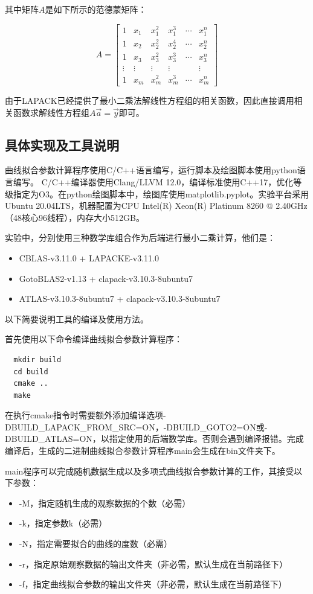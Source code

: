 \documentclass[a4paper]{article}
\begin{document}
其中矩阵$A$是如下所示的范德蒙矩阵：

\begin{equation*}
  A=
  \begin{bmatrix}
    1      & x_1    & x_1^2  & x_1^3  & \cdots & x_1^n  \\
    1      & x_2    & x_2^2  & x_2^4  & \cdots & x_2^n  \\
    1      & x_3    & x_3^2  & x_3^3  & \cdots & x_3^n  \\
    \vdots & \vdots & \vdots & \vdots &        & \vdots \\
    1      & x_m    & x_m^2  & x_m^3  & \cdots & x_m^n
  \end{bmatrix}
\end{equation*}

由于LAPACK已经提供了最小二乘法解线性方程组的相关函数，因此直接调用相关函数求解线性方程组$A\overrightarrow{a}=\overrightarrow{y}$即可。

\subsection{具体实现及工具说明}
曲线拟合参数计算程序使用C/C++语言编写，运行脚本及绘图脚本使用python语言编写。
C/C++编译器使用Clang/LLVM 12.0，编译标准使用C++17，优化等级指定为O3。在python绘图脚本中，绘图库使用matplotlib.pyplot。实验平台采用Ubuntu 20.04LTS，机器配置为CPU Intel(R) Xeon(R) Platinum 8260 @ 2.40GHz（48核心96线程），内存大小512GB。

实验中，分别使用三种数学库组合作为后端进行最小二乘计算，他们是：
\begin{itemize}
  \item CBLAS-v3.11.0 + LAPACKE-v3.11.0
  \item GotoBLAS2-v1.13 + clapack-v3.10.3-8ubuntu7
  \item ATLAS-v3.10.3-8ubuntu7 + clapack-v3.10.3-8ubuntu7
\end{itemize}

以下简要说明工具的编译及使用方法。

首先使用以下命令编译曲线拟合参数计算程序：
\begin{lstlisting}
  mkdir build
  cd build
  cmake ..
  make   
\end{lstlisting}
在执行cmake指令时需要额外添加编译选项-DBUILD\_LAPACK\_FROM\_SRC=ON，-DBUILD\_GOTO2=ON或-DBUILD\_ATLAS=ON，以指定使用的后端数学库。否则会遇到编译报错。完成编译后，生成的二进制曲线拟合参数计算程序main会生成在bin文件夹下。

main程序可以完成随机数据生成以及多项式曲线拟合参数计算的工作，其接受以下参数：
\begin{itemize}
  \item -M，指定随机生成的观察数据的个数（必需）
  \item -k，指定参数k（必需）
  \item -N，指定需要拟合的曲线的度数（必需）
  \item -r，指定原始观察数据的输出文件夹（非必需，默认生成在当前路径下）
  \item -f，指定曲线拟合参数的输出文件夹（非必需，默认生成在当前路径下）
\end{itemize}
\end{document}
